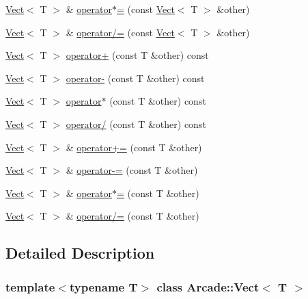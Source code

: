 \begin{DoxyCompactItemize}
\item 
\hyperlink{class_arcade_1_1_vect}{Vect}$<$ T $>$ \& \hyperlink{class_arcade_1_1_vect_a555efa11a995294522ab2f84455c2fea}{operator$\ast$=} (const \hyperlink{class_arcade_1_1_vect}{Vect}$<$ T $>$ \&other)
\item 
\hyperlink{class_arcade_1_1_vect}{Vect}$<$ T $>$ \& \hyperlink{class_arcade_1_1_vect_ae3114c792862c161769fbe2d1ce25df8}{operator/=} (const \hyperlink{class_arcade_1_1_vect}{Vect}$<$ T $>$ \&other)
\item 
\hyperlink{class_arcade_1_1_vect}{Vect}$<$ T $>$ \hyperlink{class_arcade_1_1_vect_ac03e7d5e4be634948b7a18541d8131ab}{operator+} (const T \&other) const
\item 
\hyperlink{class_arcade_1_1_vect}{Vect}$<$ T $>$ \hyperlink{class_arcade_1_1_vect_ae519ffdc7a4e3c79f7172df51bdf32c1}{operator-\/} (const T \&other) const
\item 
\hyperlink{class_arcade_1_1_vect}{Vect}$<$ T $>$ \hyperlink{class_arcade_1_1_vect_a88a56be9ee5a46ff58f08714315840ac}{operator$\ast$} (const T \&other) const
\item 
\hyperlink{class_arcade_1_1_vect}{Vect}$<$ T $>$ \hyperlink{class_arcade_1_1_vect_ad7cab0bc6711c2b9ec6aa5d11614f01e}{operator/} (const T \&other) const
\item 
\hyperlink{class_arcade_1_1_vect}{Vect}$<$ T $>$ \& \hyperlink{class_arcade_1_1_vect_a4da391cc6d6aaadc70819d7b50af6291}{operator+=} (const T \&other)
\item 
\hyperlink{class_arcade_1_1_vect}{Vect}$<$ T $>$ \& \hyperlink{class_arcade_1_1_vect_a0c2f3a86672b88f6baec98b5f2e9ad49}{operator-\/=} (const T \&other)
\item 
\hyperlink{class_arcade_1_1_vect}{Vect}$<$ T $>$ \& \hyperlink{class_arcade_1_1_vect_a64363c0a5ff75713a11174f48de1a8ea}{operator$\ast$=} (const T \&other)
\item 
\hyperlink{class_arcade_1_1_vect}{Vect}$<$ T $>$ \& \hyperlink{class_arcade_1_1_vect_a6777436fa526fb4397c169dd1a7fe6e5}{operator/=} (const T \&other)
\end{DoxyCompactItemize}


\subsection{Detailed Description}
\subsubsection*{template$<$typename T$>$\newline
class Arcade\+::\+Vect$<$ T $>$}

